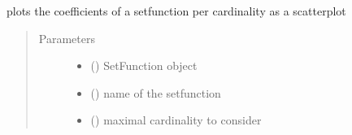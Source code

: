 \documentclass[letterpaper,10pt,english]{sphinxmanual}
\begin{document}

\begin{fulllineitems}
\label{\detokenize{setFTs:setFTs.plotting.plot_scatter}}
\sphinxAtStartPar
plots the coefficients of a setfunction per cardinality as a scatterplot
\begin{quote}\begin{description}
\item[{Parameters}] \leavevmode\begin{itemize}
\item {} 
\sphinxAtStartPar
{} ({\hyperref[\detokenize{setFTs:setFTs.setfunctions.SetFunction}]{}}) \textendash{} SetFunction object

\item {} 
\sphinxAtStartPar
{} () \textendash{} name of the setfunction

\item {} 
\sphinxAtStartPar
{} () \textendash{} maximal cardinality to consider

\end{itemize}

\end{description}\end{quote}

\end{fulllineitems}

\end{document}
